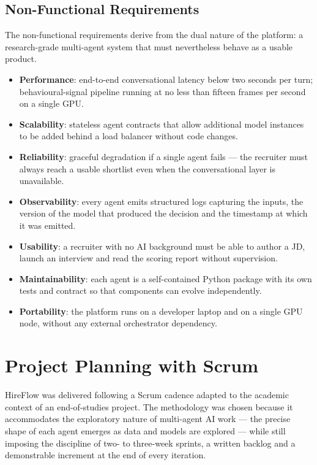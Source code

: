\subsection{Non-Functional Requirements}

The non-functional requirements derive from the dual nature of the
platform: a research-grade multi-agent system that must nevertheless
behave as a usable product.
\begin{itemize}
    \item \textbf{Performance}: end-to-end conversational latency below
    two seconds per turn; behavioural-signal pipeline running at no
    less than fifteen frames per second on a single \acs{GPU}.
    \item \textbf{Scalability}: stateless agent contracts that allow
    additional model instances to be added behind a load balancer
    without code changes.
    \item \textbf{Reliability}: graceful degradation if a single agent
    fails --- the recruiter must always reach a usable shortlist even
    when the conversational layer is unavailable.
    \item \textbf{Observability}: every agent emits structured logs
    capturing the inputs, the version of the model that produced the
    decision and the timestamp at which it was emitted.
    \item \textbf{Usability}: a recruiter with no \acs{AI} background
    must be able to author a \acs{JD}, launch an interview and read
    the scoring report without supervision.
    \item \textbf{Maintainability}: each agent is a self-contained
    Python package with its own tests and contract so that components
    can evolve independently.
    \item \textbf{Portability}: the platform runs on a developer laptop
    and on a single \acs{GPU} node, without any external orchestrator
    dependency.
\end{itemize}

\section{Project Planning with Scrum}

HireFlow was delivered following a Scrum cadence adapted to the
academic context of an end-of-studies project. The methodology was
chosen because it accommodates the exploratory nature of multi-agent
\acs{AI} work --- the precise shape of each agent emerges as data and
models are explored --- while still imposing the discipline of
two- to three-week sprints, a written backlog and a demonstrable
increment at the end of every iteration.

